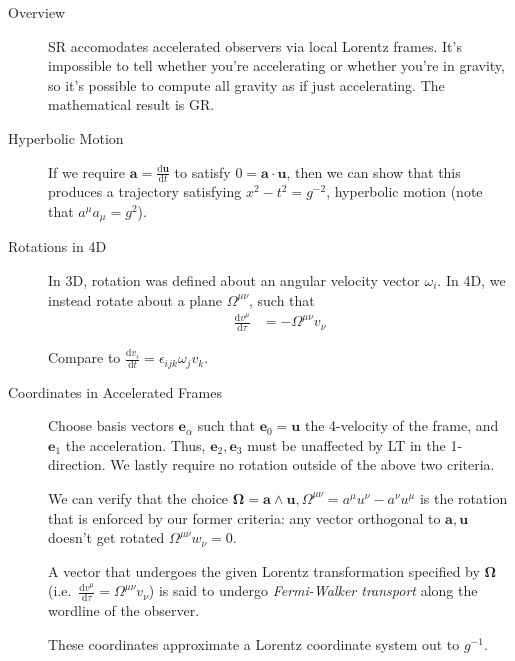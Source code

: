 \documentclass[12pt]{report}
\newcommand{\rd}[2]{\frac{\mathrm{d}#1}{\mathrm{d}#2}}
\begin{document}
\begin{description}
    \item[Overview] SR accomodates accelerated observers via local Lorentz
        frames. It's impossible to tell whether you're accelerating or whether
        you're in gravity, so it's possible to compute all gravity as if just
        accelerating. The mathematical result is GR\@.

    \item[Hyperbolic Motion] If we require $\mathbf{a} = \rd{\mathbf{u}}{t}$ to
        satisfy $0 = \mathbf{a} \cdot \mathbf{u}$, then we can show that this
        produces a trajectory satisfying $x^2 - t^2 = g^{-2}$, hyperbolic
        motion (note that $a^\mu a_\mu = g^2$).

    \item[Rotations in 4D] In 3D, rotation was defined about an angular velocity
        vector $\omega_i$. In 4D, we instead rotate about a plane
        $\Omega^{\mu\nu}$, such that
        \begin{align}
            \rd{v^\mu}{\tau} &= -\Omega^{\mu\nu}v_\nu
        \end{align}

        Compare to $\rd{v_i}{t} = \epsilon_{ijk} \omega_j v_k$.

    \item[Coordinates in Accelerated Frames] Choose basis vectors
        $\mathbf{e}_\alpha$ such that $\mathbf{e}_0 = \mathbf{u}$ the 4-velocity
        of the frame, and $\mathbf{e}_1$ the acceleration. Thus, $\mathbf{e}_2,
        \mathbf{e}_3$ must be unaffected by LT in the 1-direction. We lastly
        require no rotation outside of the above two criteria.

        We can verify that the choice $\mathbf{\Omega} = \mathbf{a} \wedge
        \mathbf{u}, \Omega^{\mu\nu} = a^\mu u^\nu - a^\nu u^\mu$ is the rotation
        that is enforced by our former criteria: any vector orthogonal to
        $\mathbf{a}, \mathbf{u}$ doesn't get rotated $\Omega^{\mu\nu}w_\nu = 0$.

        A vector that undergoes the given Lorentz transformation specified by
        $\mathbf{\Omega}$ (i.e.\ $\rd{v^\mu}{\tau} = \Omega^{\mu\nu}v_\nu$) is
        said to undergo \emph{Fermi-Walker transport} along the wordline of the
        observer.

        These coordinates approximate a Lorentz coordinate system out to
        $g^{-1}$.

\end{description}
\end{document}
